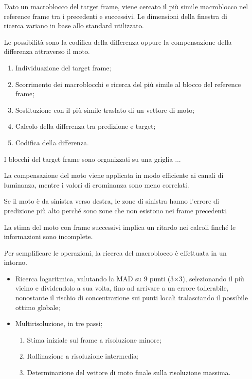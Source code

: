 Dato un macroblocco del target frame, viene cercato il più simile macroblocco nel reference frame tra i precedenti e successivi. Le dimensioni della finestra di ricerca variano in base allo standard utilizzato. 


Le possibilità sono la codifica della differenza oppure la compensazione della differenza attraverso il moto. 

\begin{enumerate}
	\item Individuazione del target frame;
	\item Scorrimento dei macroblocchi e ricerca del più simile al blocco del reference frame;
	\item Sostituzione con il più simile traslato di un vettore di moto;
	\item Calcolo della differenza tra predizione e target;
	\item Codifica della differenza.
\end{enumerate}

I blocchi del target frame sono organizzati su una griglia ...

La compensazione del moto viene applicata in modo efficiente ai canali di luminanza, mentre i valori di crominanza sono meno correlati. 

Se il moto è da sinistra verso destra, le zone di sinistra hanno l'errore di predizione più alto perché sono zone che non esistono nei frame precedenti.

La stima del moto con frame successivi implica un ritardo nei calcoli finché le informazioni sono incomplete.

Per semplificare le operazioni, la ricerca del macroblocco è effettuata in un intorno. 
\begin{itemize}
	\item Ricerca logaritmica, valutando la MAD su 9 punti (3$\times$3), selezionando il più vicino e dividendolo a sua volta, fino ad arrivare a un errore tollerabile, nonostante il rischio di concentrazione sui punti locali tralasciando il possibile ottimo globale;
	\item Multirisoluzione, in tre passi;
	\begin{enumerate}
		\item Stima iniziale sul frame a risoluzione minore;
		\item Raffinazione a risoluzione intermedia;
		\item Determinazione del vettore di moto finale sulla risoluzione massima.
	\end{enumerate}
\end{itemize}

